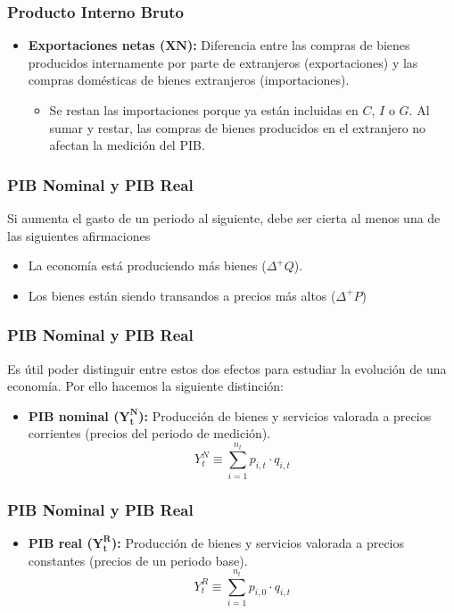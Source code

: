 \documentclass[dvipsnames,table,leqno]{beamer}
\newcommand{\peq}[1]{{\scriptscriptstyle{#1}}}
\begin{document}
		\begin{frame}
			\frametitle{Producto Interno Bruto}
			\begin{itemize}
				\item \textbf{Exportaciones netas ($\mathbf{XN}$):} Diferencia entre las compras de bienes producidos internamente por parte de extranjeros (exportaciones) y las compras domésticas de bienes extranjeros (importaciones).
					\begin{itemize}
						\item Se restan las importaciones porque ya están incluidas en $C$, $I$ o $G$. Al sumar y restar, las compras de bienes producidos en el extranjero no afectan la medición del PIB.
					\end{itemize}			 
			\end{itemize}
		\end{frame}

		\begin{frame}
			\frametitle{PIB Nominal y PIB Real}
			Si aumenta el gasto de un periodo al siguiente, debe ser cierta al menos una de las siguientes afirmaciones
			\begin{itemize}
				\item La economía está produciendo más bienes ($\Delta^\peq{+}Q$).
				\item Los bienes están siendo transandos a precios más altos ($\Delta^\peq{+}P$)
			\end{itemize}
		\end{frame}

		\begin{frame}
			\frametitle{PIB Nominal y PIB Real}
			Es útil poder distinguir entre estos dos efectos para estudiar la evolución de una economía. Por ello hacemos la siguiente distinción:
			\begin{itemize}
				\item \textbf{PIB nominal ($\mathbf{Y_\peq{t}^\peq{N}}$):} Producción de bienes y servicios valorada a precios corrientes (precios del periodo de medición). $$Y_\peq{t}^\peq{N}\equiv\sum_\peq{i=1}^{n_\peq{t}}p_\peq{i,t}\cdot q_\peq{i,t}$$
			\end{itemize}
		\end{frame}

		\begin{frame}
			\frametitle{PIB Nominal y PIB Real}
			\begin{itemize}
				\item \textbf{PIB real ($\mathbf{Y_\peq{t}^\peq{R}}$):} Producción de bienes y servicios valorada a precios constantes (precios de un periodo base). $$Y_\peq{t}^\peq{R}\equiv\sum_\peq{i=1}^{n_\peq{t}}p_\peq{i,0}\cdot q_\peq{i,t}$$
			\end{itemize}
		\end{frame}
\end{document}
